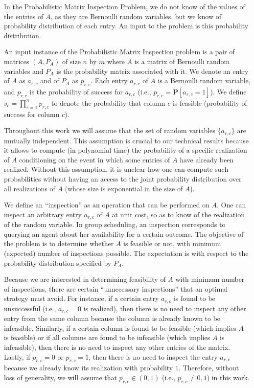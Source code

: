  In the Probabilistic Matrix Inspection Problem, we do not know of the values of the entries of $A$, as they are Bernoulli random variables, but we know of probability distribution of each entry.
 An input to the problem is this probability distribution. 
 \begin{definition}
 An input instance of the Probabilistic Matrix Inspection problem is a pair of matrices $(A, P_A)$ of size $n$ by $m$
 where $A$ is a matrix of Bernoulli random variables 
 and $P_A$ is the probability matrix associated with it.
 We denote an entry of $A$ as $a_{r,c}$ and of $P_A$ as $p_{r,c}$.
 Each entry $a_{r,c}$ of $A$ is a Bernoulli random variable, and $p_{r,c}$ is the probability of success for $a_{r,c}$ (i.e., $p_{r,c} = \mathbf{P}[a_{r,c} = 1]$).
 We define $s_c = \prod_{r=1}^{n} p_{r,c}$ to denote the probability that column $c$ is feasible (probability of success for column $c$).
 \end{definition}
 Throughout this work we will assume that the set of random variables $\{a_{r,c}\}$ are mutually independent. This assumption is crucial to our technical results because it allows to compute (in polynomial time) the probability of a specific realization of $A$ conditioning on the event in which some entries of $A$ have already been realized. 
 Without this assumption, it is unclear how one can compute such probabilities without having an access to the joint probability distribution over all realizations of $A$ (whose size is exponential in the size of $A$).

 We define an ``inspection'' as an operation that can be performed on $A$. 
 One can inspect an arbitrary entry $a_{r,c}$ of $A$ at unit cost, so as to know of the realization of the random variable. In group scheduling, an inspection corresponds to querying an agent about her availability for a certain outcome. 
 The objective of the problem is to determine whether $A$ is feasible or not, with minimum (expected) number of inspections possible. The expectation is with respect to the probability distribution specified by $P_A$.

 Because we are interested in determining feasibility of $A$ with minimum number of inspections, there are certain ``unnecessary inspections'' that an optimal strategy must avoid.
 For instance, if a certain entry $a_{r,c}$ is found to be unsuccessful (i.e., $a_{r,c} = 0$ is realized), then there is no need to inspect any other entry from the same column because the column is already known to be infeasible. Similarly, if a certain column is found to be feasible (which implies $A$ is feasible) or if all columns are found to be infeasible (which implies $A$ is infeasible), then there is no need to inspect any other entries of the matrix. Lastly, if $p_{r,c} = 0$ or $p_{r,c} = 1$, then there is no need to inspect the entry $a_{r,c}$ because we already know its realization with probability $1$.
 Therefore, without loss of generality, we will assume that $p_{r,c} \in (0,1)$ (i.e., $p_{r,c}\neq 0,1$) in this work. 


